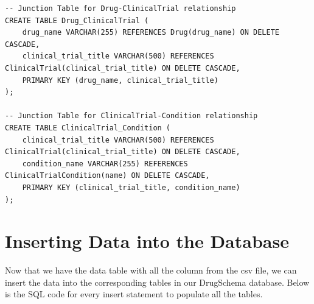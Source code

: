 \documentclass[12pt,a4paper]{article}
\begin{document}
\begin{lstlisting}[style=sqlstyle]
-- Junction Table for Drug-ClinicalTrial relationship
CREATE TABLE Drug_ClinicalTrial (
    drug_name VARCHAR(255) REFERENCES Drug(drug_name) ON DELETE CASCADE,
    clinical_trial_title VARCHAR(500) REFERENCES ClinicalTrial(clinical_trial_title) ON DELETE CASCADE,
    PRIMARY KEY (drug_name, clinical_trial_title)
);

-- Junction Table for ClinicalTrial-Condition relationship
CREATE TABLE ClinicalTrial_Condition (
    clinical_trial_title VARCHAR(500) REFERENCES ClinicalTrial(clinical_trial_title) ON DELETE CASCADE,
    condition_name VARCHAR(255) REFERENCES ClinicalTrialCondition(name) ON DELETE CASCADE,
    PRIMARY KEY (clinical_trial_title, condition_name)
);
\end{lstlisting}
\newpage
\section{Inserting Data into the Database}

Now that we have the data table with all the column from the csv file, we can insert the data into the corresponding tables in our DrugSchema database. Below is the SQL code for every insert statement to populate all the tables.
\end{document}
